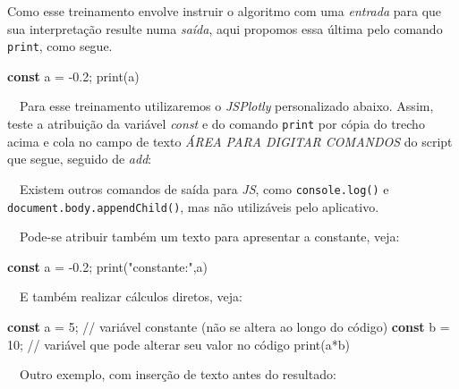 \documentclass[
  portuguese,
  letterpaper,
  DIV=11,
  numbers=noendperiod]{scrreprt}
\newenvironment{Shaded}{\begin{snugshade}}{\end{snugshade}}
\newcommand{\CommentTok}[1]{\textcolor[rgb]{0.37,0.37,0.37}{#1}}
\newcommand{\DecValTok}[1]{\textcolor[rgb]{0.68,0.00,0.00}{#1}}
\newcommand{\FloatTok}[1]{\textcolor[rgb]{0.68,0.00,0.00}{#1}}
\newcommand{\FunctionTok}[1]{\textcolor[rgb]{0.28,0.35,0.67}{#1}}
\newcommand{\KeywordTok}[1]{\textcolor[rgb]{0.00,0.23,0.31}{\textbf{#1}}}
\newcommand{\NormalTok}[1]{\textcolor[rgb]{0.00,0.23,0.31}{#1}}
\newcommand{\OperatorTok}[1]{\textcolor[rgb]{0.37,0.37,0.37}{#1}}
\newcommand{\StringTok}[1]{\textcolor[rgb]{0.13,0.47,0.30}{#1}}
\begin{document}
Como esse treinamento envolve instruir o algoritmo com uma
\emph{entrada} para que sua interpretação resulte numa \emph{saída},
aqui propomos essa última pelo comando \texttt{print}, como segue.

\begin{Shaded}
\begin{Highlighting}[]
\KeywordTok{const}\NormalTok{ a }\OperatorTok{=} \OperatorTok{{-}}\FloatTok{0.2}\OperatorTok{;}
\FunctionTok{print}\NormalTok{(a)}
\end{Highlighting}
\end{Shaded}

~~Para esse treinamento utilizaremos o \emph{JSPlotly} personalizado
abaixo. Assim, teste a atribuição da variável \emph{const} e do comando
\texttt{print} por cópia do trecho acima e cola no campo de texto
\emph{ÁREA PARA DIGITAR COMANDOS} do script que segue, seguido de
\emph{add}:

\hfill\break

~~Existem outros comandos de saída para \emph{JS}, como
\texttt{console.log()} e \texttt{document.body.appendChild()}, mas não
utilizáveis pelo aplicativo.

~~Pode-se atribuir também um texto para apresentar a constante, veja:

\hfill\break

\begin{Shaded}
\begin{Highlighting}[]
\KeywordTok{const}\NormalTok{ a }\OperatorTok{=} \OperatorTok{{-}}\FloatTok{0.2}\OperatorTok{;}
\FunctionTok{print}\NormalTok{(}\StringTok{"constante:"}\OperatorTok{,}\NormalTok{a)}
\end{Highlighting}
\end{Shaded}

~~E também realizar cálculos diretos, veja:

\hfill\break

\begin{Shaded}
\begin{Highlighting}[]
\KeywordTok{const}\NormalTok{ a }\OperatorTok{=} \DecValTok{5}\OperatorTok{;} \CommentTok{// variável constante (não se altera ao longo do código)}
\KeywordTok{const}\NormalTok{ b }\OperatorTok{=} \DecValTok{10}\OperatorTok{;} \CommentTok{// variável que pode alterar seu valor no código}
\FunctionTok{print}\NormalTok{(a}\OperatorTok{*}\NormalTok{b)}
\end{Highlighting}
\end{Shaded}

~~Outro exemplo, com inserção de texto antes do resultado:
\end{document}
